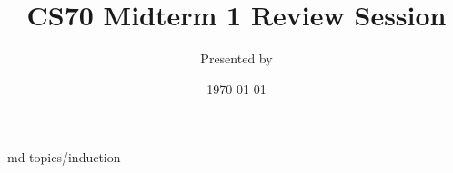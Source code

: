 

\title{CS70 Midterm 1 Review Session}
\author{Presented by }
\date{\today}

\newcommand{\SlideAccessingLogistics}{@\#}





%




 {md-topics/induction}



